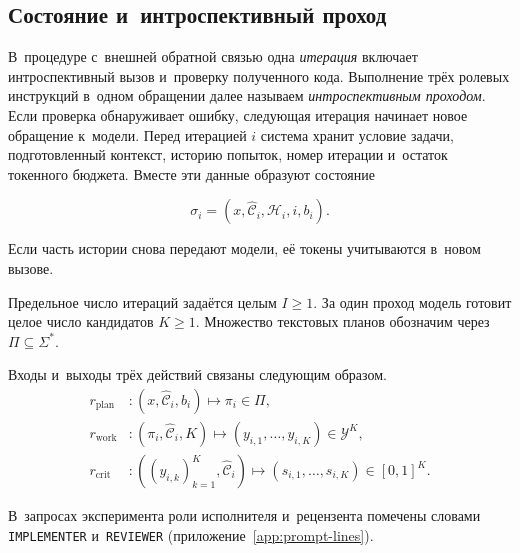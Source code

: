 \subsection{Состояние и~интроспективный проход}
В~процедуре с~внешней обратной связью одна \emph{итерация} включает интроспективный вызов и~проверку полученного кода. Выполнение трёх ролевых инструкций в~одном обращении далее называем \emph{интроспективным проходом}. Если проверка обнаруживает ошибку, следующая итерация начинает новое обращение к~модели. Перед итерацией $i$ система хранит условие задачи, подготовленный контекст, историю попыток, номер итерации и~остаток токенного бюджета. Вместе эти данные образуют состояние
\begin{formulakey}
\begin{equation}
\sigma_i=(x,\widehat{\mathcal{C}}_i,\mathcal{H}_i,i,b_i).
\end{equation}
\begin{symbols}
\end{symbols}
\end{formulakey}
Если часть истории снова передают модели, её токены учитываются в~новом вызове.

Предельное число итераций задаётся целым $I\ge1$. За один проход модель готовит целое число кандидатов $K\ge1$. Множество текстовых планов обозначим через $\Pi\subseteq\Sigma^*$.
\begin{formulakey}
Входы и~выходы трёх действий связаны следующим образом.
\nopagebreak
\begin{align}
r_{\mathrm{plan}} &: (x,\widehat{\mathcal{C}}_i,b_i)\mapsto\pi_i\in\Pi,\\
r_{\mathrm{work}} &: (\pi_i,\widehat{\mathcal{C}}_i,K)\mapsto(y_{i,1},\ldots,y_{i,K})\in\mathcal{Y}^{K},\\
r_{\mathrm{crit}} &: ((y_{i,k})_{k=1}^{K},\widehat{\mathcal{C}}_i)\mapsto(s_{i,1},\ldots,s_{i,K})\in[0,1]^K.
\end{align}
\begin{symbols}
\end{symbols}
\end{formulakey}
В~запросах эксперимента роли исполнителя и~рецензента помечены словами \texttt{IMPLEMENTER} и~\texttt{REVIEWER} (приложение~\ref{app:prompt-lines}).

